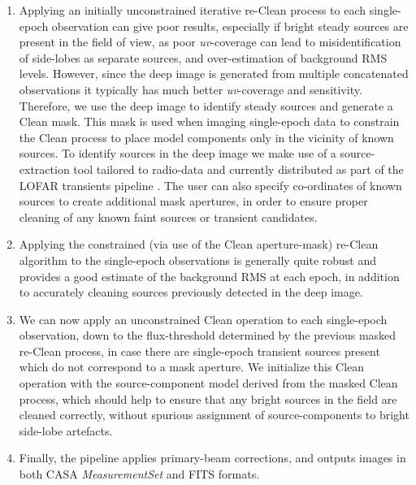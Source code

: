 \documentclass[5p,authoryear]{elsarticle}
\begin{document}
\begin{enumerate}[I]
 \item Applying an initially unconstrained iterative re-Clean process to each single-epoch observation can give poor results, especially if bright steady sources are present in the field of view, as poor \textit{uv}-coverage can lead to misidentification of side-lobes as separate sources,  and over-estimation of background RMS levels. 
 However, since the deep image is generated from multiple concatenated observations it typically has much better \textit{uv}-coverage and sensitivity. Therefore, we use the deep image to identify steady sources and generate a Clean mask. 
 This mask is used when imaging single-epoch data to constrain the Clean process to place model components only in the vicinity of known sources. 
 To identify sources in the deep image we make use of a source-extraction tool tailored to radio-data and currently distributed as part of the LOFAR transients pipeline \citep{Trap2014,Swinbank2015}.
 The user can also specify co-ordinates of known sources to create additional mask apertures, in order to ensure proper cleaning of any known faint sources or transient candidates. 
 
 \item  Applying the constrained (via use of the Clean aperture-mask) re-Clean algorithm to the single-epoch observations is generally quite robust and provides a good estimate of the background RMS at each epoch, in addition to accurately cleaning sources previously detected in the deep image.
 
 \item We can now apply an unconstrained Clean operation to each single-epoch observation, down to the flux-threshold determined by the previous masked re-Clean process, in case there are single-epoch transient sources present which do not correspond to a mask aperture. 
 We initialize this Clean operation with the source-component model derived from the masked Clean process, which should help to ensure that any bright sources in the field are cleaned correctly, without spurious assignment of source-components to bright side-lobe artefacts.
 
 \item Finally, the pipeline applies primary-beam corrections, and outputs images in both CASA \textit{MeasurementSet} and FITS formats.
\end{enumerate}
\end{document}
